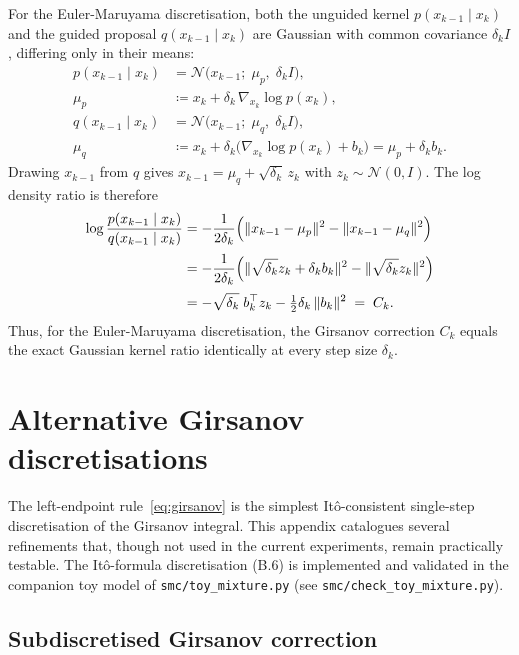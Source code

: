 \documentclass[11pt]{article}
\begin{document}
For the Euler-Maruyama discretisation, both the unguided kernel
$p(x_{k-1}\mid x_k)$ and the guided proposal $q(x_{k-1}\mid x_k)$ are Gaussian
with common covariance $\delta_k I$, differing only in their means:
\begin{align*}
  p(x_{k-1}\mid x_k) &= \mathcal{N}\bigl(x_{k-1};\; \mu_p,\; \delta_k I\bigr),\\
  \mu_p &\coloneqq x_k + \delta_k\,\nabla_{x_k}\!\log p(x_k),\\[2pt]
  q(x_{k-1}\mid x_k) &= \mathcal{N}\bigl(x_{k-1};\; \mu_q,\; \delta_k I\bigr),\\
  \mu_q &\coloneqq x_k + \delta_k\bigl(\nabla_{x_k}\!\log p(x_k) + b_k\bigr)
          = \mu_p + \delta_k b_k.
\end{align*}
Drawing $x_{k-1}$ from $q$ gives $x_{k-1} = \mu_q + \sqrt{\delta_k}\,z_k$ with
$z_k \sim \mathcal{N}(0,I)$.
The log density ratio is therefore
\begin{align*}
  \log\frac{p(x_{k-1}\mid x_k)}{q(x_{k-1}\mid x_k)}
  &= -\frac{1}{2\delta_k}\Bigl(
       \|x_{k-1}-\mu_p\|^2 - \|x_{k-1}-\mu_q\|^2\Bigr)\\[2pt]
  &= -\frac{1}{2\delta_k}\Bigl(
       \|\sqrt{\delta_k}z_k + \delta_k b_k\|^2 - \|\sqrt{\delta_k}z_k\|^2\Bigr)\\[2pt]
  &= -\sqrt{\delta_k}\;b_k^\top z_k - \tfrac12\delta_k\,\|b_k\|^2
     \;=\; C_k.
\end{align*}
Thus, for the Euler-Maruyama discretisation, the Girsanov correction $C_k$
equals the exact Gaussian kernel ratio identically at every step size $\delta_k$.

\section{Alternative Girsanov discretisations}\label{app:alternatives}

The left-endpoint rule~\eqref{eq:girsanov} is the simplest It\^o-consistent
single-step discretisation of the Girsanov integral.
This appendix catalogues several refinements that, though not used in the
current experiments, remain practically testable.
The It\^o-formula discretisation (B.6) is implemented and validated
in the companion toy model of \texttt{smc/toy\_mixture.py}
(see \texttt{smc/check\_toy\_mixture.py}).

\subsection{Subdiscretised Girsanov correction}
\end{document}
